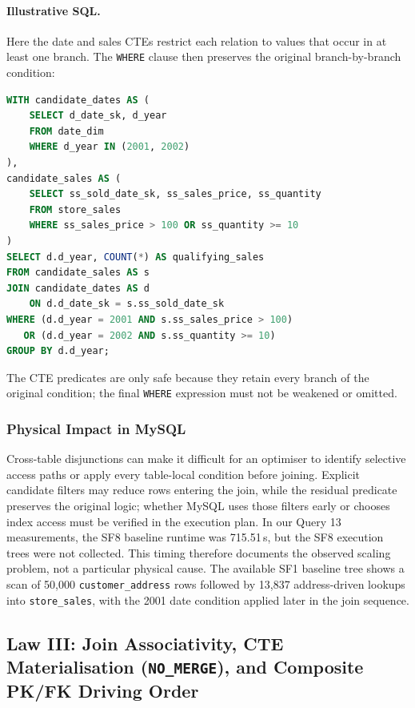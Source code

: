 \documentclass{ULBreport}
\begin{document}
\paragraph{Illustrative SQL.}
Here the date and sales CTEs restrict each relation to values that occur in at least one branch. The \texttt{WHERE} clause then preserves the original branch-by-branch condition:
\begin{lstlisting}[language=SQL, basicstyle=\ttfamily\scriptsize, breaklines=true, frame=single]
WITH candidate_dates AS (
    SELECT d_date_sk, d_year
    FROM date_dim
    WHERE d_year IN (2001, 2002)
),
candidate_sales AS (
    SELECT ss_sold_date_sk, ss_sales_price, ss_quantity
    FROM store_sales
    WHERE ss_sales_price > 100 OR ss_quantity >= 10
)
SELECT d.d_year, COUNT(*) AS qualifying_sales
FROM candidate_sales AS s
JOIN candidate_dates AS d
    ON d.d_date_sk = s.ss_sold_date_sk
WHERE (d.d_year = 2001 AND s.ss_sales_price > 100)
   OR (d.d_year = 2002 AND s.ss_quantity >= 10)
GROUP BY d.d_year;
\end{lstlisting}
The CTE predicates are only safe because they retain every branch of the original condition; the final \texttt{WHERE} expression must not be weakened or omitted.

\subsubsection{Physical Impact in MySQL}
Cross-table disjunctions can make it difficult for an optimiser to identify selective access paths or apply every table-local condition before joining. Explicit candidate filters may reduce rows entering the join, while the residual predicate preserves the original logic; whether MySQL uses those filters early or chooses index access must be verified in the execution plan. In our Query 13 measurements, the SF8 baseline runtime was 715.51\,s, but the SF8 execution trees were not collected. This timing therefore documents the observed scaling problem, not a particular physical cause. The available SF1 baseline tree shows a scan of 50,000 \texttt{customer\_address} rows followed by 13,837 address-driven lookups into \texttt{store\_sales}, with the 2001 date condition applied later in the join sequence.

\subsection{Law III: Join Associativity, CTE Materialisation (\texttt{NO\_MERGE}), and Composite PK/FK Driving Order}
\end{document}
